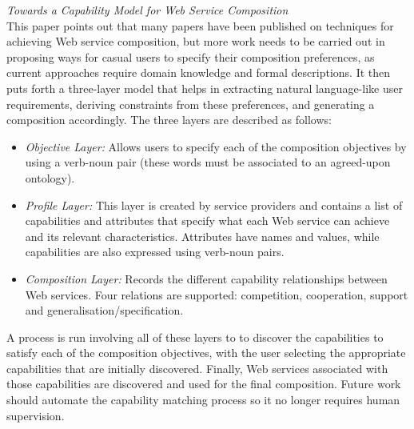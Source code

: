 \textit{Towards a Capability Model for Web Service Composition \cite{li2013towards}}\\
This paper points out that many papers have been published on techniques for achieving Web service composition, but more work
needs to be carried out in proposing ways for casual users to specify their composition preferences, as current approaches require
domain knowledge and formal descriptions. It then puts forth a three-layer model that helps in extracting natural language-like
user requirements, deriving constraints from these preferences, and generating a composition accordingly. The three layers are described
as follows:

\begin{itemize}
 \item \textit{Objective Layer:} Allows users to specify each of the composition objectives by using a verb-noun pair (these words
 must be associated to an agreed-upon ontology).
 \item \textit{Profile Layer:} This layer is created by service providers and contains a list of capabilities and attributes that specify what each
 Web service can achieve and its relevant characteristics. Attributes have names and values, while capabilities are also expressed using
 verb-noun pairs.
 \item \textit{Composition Layer:} Records the different capability relationships between Web services. Four relations are supported: competition,
 cooperation, support and generalisation/specification.
\end{itemize}

A process is run involving all of these layers to to discover the capabilities to satisfy each of the composition objectives, with the user selecting
the appropriate capabilities that are initially discovered. Finally, Web services associated with those capabilities are discovered and used for the
final composition. Future work should automate the capability matching process so it no longer requires human supervision.





